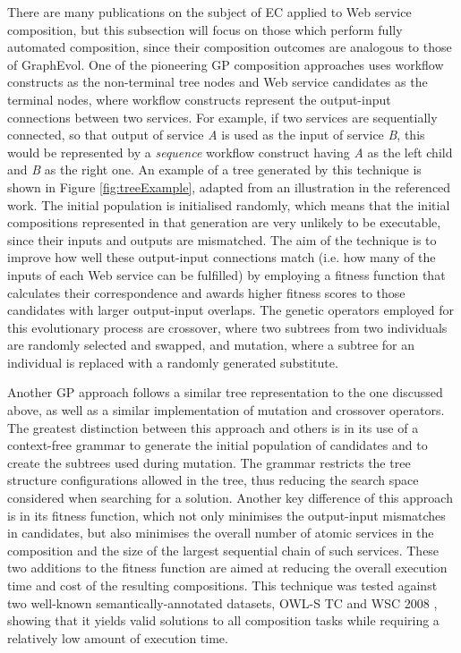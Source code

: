 \documentclass{article}
\begin{document}
There are many publications on the subject of EC applied to Web service composition, but this subsection will focus on those which perform fully automated composition,
since their composition outcomes are analogous to those of GraphEvol. One of the pioneering GP composition approaches \cite{aversano2006genetic} uses workflow constructs as the non-terminal tree nodes and Web service candidates as the terminal nodes, where workflow constructs represent the output-input connections between
two services. For example, if two services are sequentially connected, so that output of service \textit{A} is used as the input of service \textit{B}, this would be represented
by a \textit{sequence} workflow construct having \textit{A} as the left child and \textit{B} as the right one. 
An example of a tree generated by this technique is shown in Figure \ref{fig:treeExample}, adapted from an illustration in the referenced work. The initial population is initialised randomly, which means that the initial compositions represented in that generation are very unlikely to be executable, since their inputs and outputs are mismatched.
The aim of the technique is to improve how well these output-input connections match (i.e. how many of the inputs of each Web service can be fulfilled) by employing a fitness function that calculates their correspondence and awards higher fitness scores to those candidates with larger output-input overlaps. The genetic operators employed for this evolutionary process are crossover, where two subtrees from two individuals are randomly selected and swapped, and mutation, where a subtree for an individual is replaced with a randomly generated substitute.

Another GP approach \cite{rodriguez2010composition} follows a similar tree representation to the one discussed above, as well as a similar implementation of mutation and crossover operators. The greatest distinction between this approach and others is in its use of a context-free grammar to generate the initial population of candidates and to create the subtrees used during mutation. The grammar restricts the tree structure configurations allowed in the tree, thus reducing the search space considered when searching for a solution. Another key difference of this approach is in its fitness function, which not only minimises the output-input mismatches in candidates, but also minimises the overall number of atomic services in the composition and the size of the largest sequential chain of such services. These two additions to the fitness function are aimed at reducing the overall execution time and cost of the resulting compositions. This technique was tested against two well-known semantically-annotated datasets, OWL-S TC \cite{kuster2008opossum} and WSC 2008 \cite{bansal2008wsc}, showing that it yields valid solutions to all composition tasks while requiring a relatively low amount of execution time.
\end{document}
